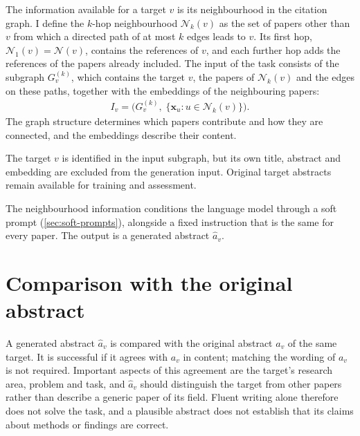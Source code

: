 The information available for a target $v$ is its neighbourhood in the citation graph. I define the $k$-hop neighbourhood $\mathcal{N}_k(v)$ as the set of papers other than $v$ from which a directed path of at most $k$ edges leads to $v$. Its first hop, $\mathcal{N}_1(v) = \mathcal{N}(v)$, contains the references of $v$, and each further hop adds the references of the papers already included. The input of the task consists of the subgraph $G^{(k)}_v$, which contains the target $v$, the papers of $\mathcal{N}_k(v)$ and the edges on these paths, together with the embeddings of the neighbouring papers:
\begin{align}
  I_v = \big(G^{(k)}_v,\; \{\mathbf{x}_u : u \in \mathcal{N}_k(v)\}\big).
  \label{eq:task-input}
\end{align}
The graph structure determines which papers contribute and how they are connected, and the embeddings describe their content.

The target $v$ is identified in the input subgraph, but its own title, abstract and embedding are excluded from the generation input. Original target abstracts remain available for training and assessment.

The neighbourhood information conditions the language model through a soft prompt (\autoref{sec:soft-prompts}), alongside a fixed instruction that is the same for every paper. The output is a generated abstract $\hat{a}_v$.

\section{Comparison with the original abstract}
\label{sec:task-success}

A generated abstract $\hat{a}_v$ is compared with the original abstract $a_v$ of the same target. It is successful if it agrees with $a_v$ in content; matching the wording of $a_v$ is not required. Important aspects of this agreement are the target's research area, problem and task, and $\hat{a}_v$ should distinguish the target from other papers rather than describe a generic paper of its field. Fluent writing alone therefore does not solve the task, and a plausible abstract does not establish that its claims about methods or findings are correct.
